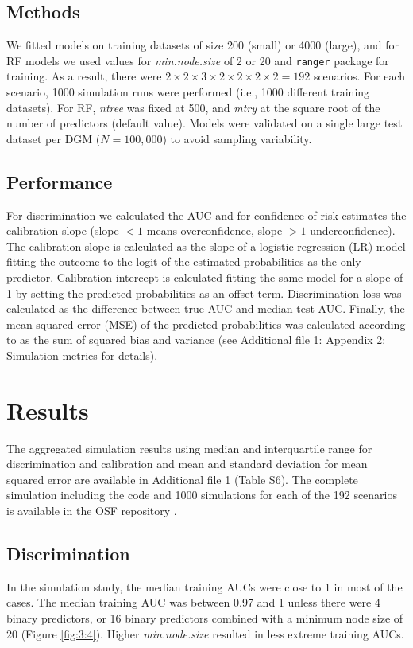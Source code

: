 \subsection{Methods}
We fitted models on training datasets of size 200 (small) or 4000 (large), and
for \gls{RF} models we used values for \textit{min.node.size} of 2 or 20 and \texttt{ranger}
package for training. As a result, there were $2 \times 2 \times 3 \times 2
\times 2 \times 2 \times 2 = 192$ scenarios. For each scenario, 1000 simulation
runs were performed (i.e., 1000 different training datasets). For \gls{RF},
\textit{ntree} was fixed at 500, and \textit{mtry} at the square root of the
number of predictors (default value). Models were validated on a single large
test dataset per \gls{DGM} ($N = 100{,}000$) to avoid sampling variability.

\subsection{Performance}
For discrimination we calculated the \gls{AUC} and for confidence of risk estimates
the calibration slope (slope $< 1$ means overconfidence, slope $> 1$
underconfidence). The calibration slope is calculated as the slope of a logistic
regression (\gls{LR}) model fitting the outcome to the logit of the estimated
probabilities as the only predictor. Calibration intercept is calculated fitting
the same model for a slope of 1 by setting the predicted probabilities as an
offset term. Discrimination loss was calculated as the difference between true
\gls{AUC} and median test \gls{AUC}. Finally, the mean squared error (\gls{MSE}) of the predicted
probabilities was calculated according to \cite{friedmanBiasVariance02004} as
the sum of squared bias and variance (see Additional file 1: Appendix 2:
Simulation metrics for details).

\section{Results}

The aggregated simulation results using median and interquartile range for
discrimination and calibration and mean and standard deviation for mean squared
error are available in Additional file 1 (Table S6). The complete simulation
including the code and 1000 simulations for each of the 192 scenarios is
available in the \gls{OSF} repository \cite{barrenadaUnderstandingOverfittingRandom2023}.

\subsection{Discrimination}
In the simulation study, the median training \glspl{AUC} were close to 1 in most of
the cases. The median training \gls{AUC} was between 0.97 and 1 unless there were 4
binary predictors, or 16 binary predictors combined with a minimum node size of
20 (Figure \ref{fig:3:4}). Higher \textit{min.node.size} resulted in less extreme training
\glspl{AUC}.

